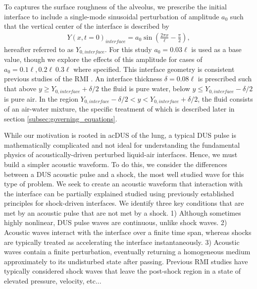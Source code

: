 \documentclass{article}
\begin{document}
To captures the surface roughness of the alveolus, we prescribe the
initial interface to include a single-mode sinusoidal perturbation of
amplitude $a_0$ such that the vertical center of the interface is
described by
\begin{align} %
  Y(x,t=0)_{interface} = a_0\sin\left(\frac{2\pi x}{\ell}-\frac{\pi}{2}\right),
\end{align}
hereafter referred to as $Y_{0,interface}$. For this study
$a_0=0.03\ell$ is used as a base value, though we explore the effects
of this amplitude for cases of $a_0=0.1\ell, 0.2\ell\ 0.3\ell$ where
specified. This interface geometry is consistent previous studies of
the \ac{RMI} \citep{Brouillette2002}. An interface thickness
$\delta=0.08\ell$ is prescribed such that above
$y\geq Y_{0,interface}+\delta/2$ the fluid is pure water, below
$y\leq Y_{0,interface}-\delta/2$ is pure air. In the region
$Y_{0,interface}-\delta/2 < y < Y_{0,interface}+\delta/2$, the fluid
consists of an air-water mixture, the specific treatment of which is
described later in section \ref{subsec:governing_equations}.

While our motivation is rooted in ac{DUS} of the lung, a typical
\ac{DUS} pulse is mathematically complicated and not ideal for
understanding the fundamental physics of acoustically-driven perturbed
liquid-air interfaces. Hence, we must build a simpler acoustic
waveform. To do this, we consider the differences between a \ac{DUS}
acoustic pulse and a shock, the most well studied wave for this type
of problem. We seek to create an acoustic waveform that interaction
with the interface can be partially explained studied using previously
established principles for shock-driven interfaces. We identify three
key conditions that are met by an acoustic pulse that are not met by a
shock. 1) Although sometimes highly nonlinear, \ac{DUS} pulse waves
are continuous, unlike shock waves. 2) Acoustic waves interact with
the interface over a finite time span, whereas shocks are typically
treated as accelerating the interface instantaneously. 3) Acoustic
waves contain a finite perturbation, eventually returning a
homogeneous medium approximately to its undisturbed state after
passing. Previous \ac{RMI} studies have typically considered shock
waves that leave the post-shock region in a state of elevated
pressure, velocity, etc... 
\end{document}
